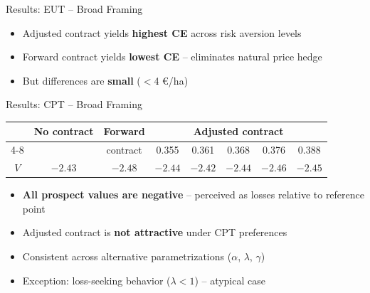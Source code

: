 \documentclass[aspectratio=169,12pt]{beamer}
\begin{document}
\begin{frame}{Results: EUT -- Broad Framing}
\small
\begin{table}
\centering
{}
\end{table}

\vspace{0.5em}
\begin{itemize}
    \item Adjusted contract yields \textbf{highest CE} across risk aversion levels
    \item Forward contract yields \textbf{lowest CE} -- eliminates natural price hedge
    \item But differences are \textbf{small} ($<$4 \euro/ha)
\end{itemize}
\end{frame}

\begin{frame}{Results: CPT -- Broad Framing}
\begin{table}
\centering
\small
\begin{tabular}{cccccccc}
\toprule
 & No contract & Forward & \multicolumn{5}{c}{Adjusted contract} \\
\cmidrule(lr){4-8}
 & & contract & 0.355 & 0.361 & 0.368 & 0.376 & 0.388 \\
\midrule
$V$ & $-2.43$ & $-2.48$ & $-2.44$ & $-2.42$ & $-2.44$ & $-2.46$ & $-2.45$ \\
\bottomrule
\end{tabular}
\end{table}

\vspace{0.5em}
\begin{itemize}
    \item \textbf{All prospect values are negative} -- perceived as losses relative to reference point
    \item Adjusted contract is \textbf{not attractive} under CPT preferences
    \item Consistent across alternative parametrizations ($\alpha$, $\lambda$, $\gamma$)
    \item Exception: loss-seeking behavior ($\lambda < 1$) -- atypical case
\end{itemize}
\end{frame}
\end{document}
